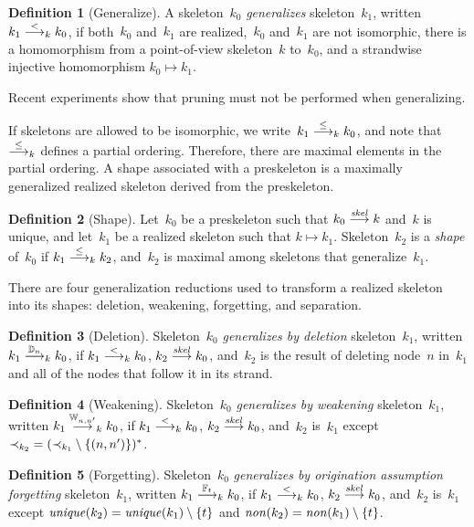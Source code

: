 \documentclass[12pt]{article}
\theoremstyle{definition}
\newtheorem{defn}{Definition}[section]
\newenvironment{note}{\itshape\par\noindent}{}
\begin{document}
\begin{defn}[Generalize]
A skeleton~$k_0$ \emph{generalizes}
skeleton~$k_1$, written $k_1\stackrel{<}{\longrightarrow}_k k_0$, if
both~$k_0$ and~$k_1$ are realized,~$k_0$ and~$k_1$ are not isomorphic,
there is a homomorphism from a point-of-view skeleton~$k$ to~$k_0$, and
a strandwise injective homomorphism $k_0\mapsto k_1$.
\end{defn}

\begin{note}
Recent experiments show that pruning must not be performed when
generalizing.
\end{note}

If skeletons are allowed to be isomorphic, we
write~$k_1\stackrel{\leq}{\longrightarrow}_k k_0$, and note that $\stackrel{\leq}{\longrightarrow}_k$
defines a partial ordering.  Therefore, there are maximal elements in
the partial ordering.  A shape associated with a preskeleton
is a maximally generalized realized skeleton derived from the
preskeleton.

\begin{defn}[Shape]
Let~$k_0$ be a preskeleton such that $k_0\stackrel{\operatorname{\mathit{skel}}}{\longrightarrow}k$
and~$k$ is unique, and let~$k_1$ be a realized skeleton such that
$k\mapsto k_1$.  Skeleton~$k_2$ is a \emph{shape} of~$k_0$ if
$k_1\stackrel{\leq}{\longrightarrow}_k k_2$, and~$k_2$ is maximal among skeletons that
generalize~$k_1$.
\end{defn}

There are four generalization reductions used to transform a realized
skeleton into its shapes: deletion, weakening, forgetting, and
separation.

\begin{defn}[Deletion]
Skeleton~$k_0$ \emph{generalizes by deletion} skeleton~$k_1$, written
$k_1\stackrel{\mathbb D_n}{\longrightarrow}_k k_0$, if $k_1\stackrel{<}{\longrightarrow}_k k_0$,
$k_2\stackrel{\operatorname{\mathit{skel}}}{\longrightarrow}k_0$, and~$k_2$ is the result of deleting
node~$n$ in~$k_1$ and all of the nodes that follow it in its strand.
\end{defn}

\begin{defn}[Weakening]
Skeleton~$k_0$ \emph{generalizes by weakening} skeleton~$k_1$, written
$k_1\stackrel{\mathbb W_{n,n'}}{\longrightarrow}_k k_0$, if $k_1\stackrel{<}{\longrightarrow}_k k_0$,
$k_2\stackrel{\operatorname{\mathit{skel}}}{\longrightarrow}k_0$, and~$k_2$ is~$k_1$ except
$\mathbin{\prec_{k_2}}=(\mathbin{\prec_{k_1}}\setminus\{(n,n')\})^\ast$.
\end{defn}

\begin{defn}[Forgetting]
Skeleton~$k_0$ \emph{generalizes by origination assumption forgetting}
skeleton~$k_1$, written $k_1\stackrel{\mathbb F_t}{\longrightarrow}_k k_0$, if
$k_1\stackrel{<}{\longrightarrow}_k k_0$, $k_2\stackrel{\operatorname{\mathit{skel}}}{\longrightarrow}k_0$, and~$k_2$
is~$k_1$ except $\operatorname{\mathit{unique}}(k_2)=\operatorname{\mathit{unique}}(k_1)\setminus\{t\}$ and
$\operatorname{\mathit{non}}(k_2)=\operatorname{\mathit{non}}(k_1)\setminus\{t\}$.
\end{defn}
\end{document}
